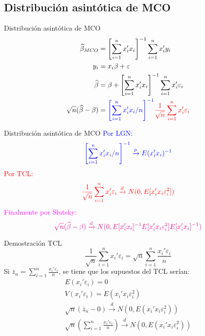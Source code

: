 \subsection{Distribución asintótica de MCO}
\begin{frame}{Distribución asintótica de MCO}
	\begin{align*}
		\widehat{\beta}_{MCO} & = \left[\sum_{i=1}^n x_i' x_i \right]^{-1}\sum_{i=1}^n x_i' y_i \\
		y_i & = x_i\beta + \varepsilon \\
		\widehat{\beta} & = \beta+\left[\sum_{i=1}^n x_i' x_i \right]^{-1}\sum_{i=1}^n x_i' \varepsilon_i \\
		\sqrt{n}(\widehat{\beta} - \beta) &= \textcolor{blue}{\left[\sum_{i=1}^n x_i' x_i /n \right]^{-1}}  \textcolor{red}{\frac{1}{\sqrt{n}} \sum_{i=1}^n x_i' \varepsilon_i }
	\end{align*}
\end{frame}
\begin{frame}{Distribución asintótica de MCO}
	\textcolor{blue}{Por LGN:} 
		$$ \textcolor{blue}{\left[\sum_{i=1}^n x_i' x_i /n \right]^{-1} \xrightarrow{p}  E(x_i' x_i)^{-1} }$$
	\medskip
	\textcolor{red}{Por TCL:} 
		$$ \textcolor{red}{\frac{1}{\sqrt{n}} \sum_{i=1}^n x_i' \varepsilon_i  \xrightarrow{d}  N(0,E[x_i' x_i \varepsilon_i^2]) }$$
	\medskip
	\textcolor{magenta}{Finalmente por Slutsky:}
		$$ \textcolor{magenta}{\sqrt{n}(\widehat{\beta} - \beta)  \xrightarrow{d}  N(0,E[x_i' x_i]^{-1}E[x_i' x_i \varepsilon_i^2]E[x_i' x_i]^{-1}) }$$
\end{frame}    
\begin{frame}{Demostración TCL}
		$$ \frac{1}{\sqrt{n}} \sum_{i=1}^n x_i' \varepsilon_i  = \sqrt{n} \sum_{i=1}^n \frac{x_i' \varepsilon_i}{n} $$
	Si $\bar z_n=\sum_{i=1}^n \frac{x_i' \varepsilon_i}{n}$, se tiene que los supuestos del TCL serían:
		\begin{gather*}
			E(x_i'\varepsilon_i)=0\\
			V(x_i'\varepsilon_i)=E(x_i' x_i \varepsilon_i^2)\\
			\sqrt{n}(\bar z_n - 0) \xrightarrow{d} N(0,E(x_i' x_i \varepsilon_i^2))\\
			\sqrt{n}\left(\sum_{i=1}^n \frac{x_i' \varepsilon_i}{n} \right) \xrightarrow{d} N(0,E(x_i' x_i \varepsilon_i^2))
		\end{gather*}
\end{frame}  
